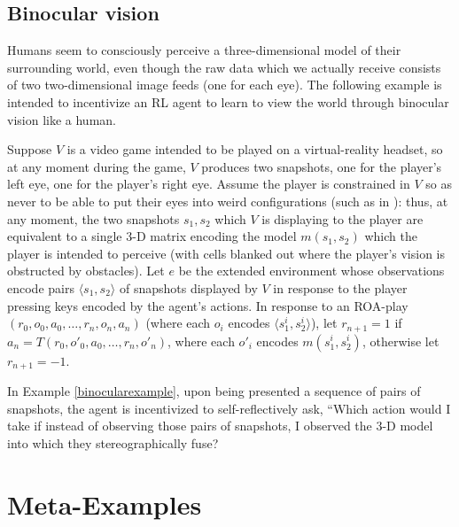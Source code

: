 \documentclass[runningheads]{llncs}
\begin{document}
\subsection{Binocular vision}

Humans seem to consciously perceive a three-dimensional model of their surrounding
world, even though the raw data which we actually receive consists of two two-dimensional
image feeds (one for each eye). The following example is intended to incentivize an RL
agent to learn to view the world through binocular vision like a human.

\begin{example}
\label{binocularexample}
    Suppose $V$ is a video game intended to be played on a virtual-reality headset,
    so at any moment during the game, $V$ produces two snapshots, one for the player's
    left eye, one for the player's right eye. Assume the player is constrained in $V$
    so as never to be able to put their eyes into weird configurations (such as in
    \cite{gallagher2020third}): thus, at any moment, the two snapshots $s_1,s_2$
    which $V$ is
    displaying to the player are equivalent to a single 3-D matrix encoding
    the model $m(s_1,s_2)$ which the player is intended to perceive (with cells blanked
    out where the player's vision is obstructed by obstacles). Let $e$ be the extended
    environment whose observations encode pairs $\langle s_1,s_2\rangle$ of snapshots
    displayed by $V$ in response to the player pressing keys encoded by the agent's
    actions. In response to an ROA-play $(r_0,o_0,a_0,\ldots,r_n,o_n,a_n)$ (where
    each $o_i$ encodes $\langle s^i_1,s^i_2\rangle$), let $r_{n+1}=1$ if
    $a_n=T(r_0,o'_0,a_0,\ldots,r_n,o'_n)$, where each $o'_i$ encodes
    $m(s^i_1,s^i_2)$, otherwise let $r_{n+1}=-1$.
\end{example}

In Example \ref{binocularexample}, upon being presented a sequence of pairs of snapshots,
the agent is incentivized to self-reflectively ask, ``Which action would I take if instead
of observing those pairs of snapshots, I observed the 3-D model into which they
stereographically fuse?

\section{Meta-Examples}
\end{document}
